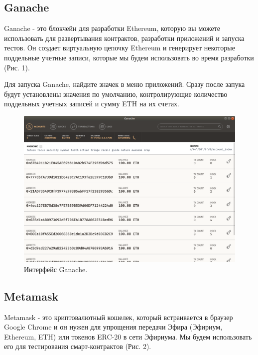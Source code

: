 \documentclass{article}
\begin{document}
\subsection{Ganache}

Ganache - это блокчейн для разработки Ethereum, которую вы можете использовать для развертывания контрактов, разработки приложений и запуска тестов. Он создает виртуальную цепочку Ethereum и генерирует некоторые поддельные учетные записи, которые мы будем использовать во время разработки (Рис. 1).

Для запуска Ganache, найдите значек в меню приложений. Сразу после запука будут установлены значения по умолчанию, контролирующие количество поддельных учетных записей и сумму ETH на их счетах.

\begin{figure}
    \centering
    \includegraphics[scale=0.4]{ganache_1}
    \caption{Интерфейс Ganache.}
    \label{fig:ganache_1}
\end{figure}

\subsection{Metamask}

Metamask -  это криптовалютный кошелек, который встраивается в браузер Google Chrome и он нужен для упрощения передачи Эфира (Эфириум,  Ethereum, ETH)  или токенов ERC-20  в сети Эфириума. Мы будем использовать его для тестирования смарт-контрактов (Рис. 2).
\end{document}
